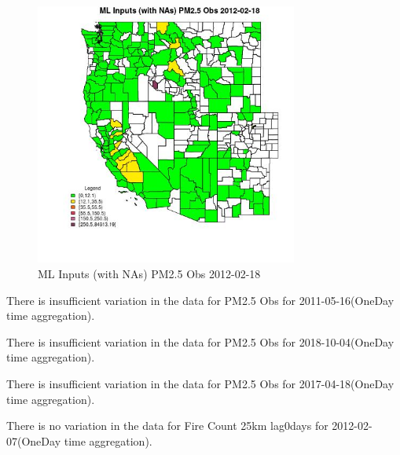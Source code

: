 \begin{figure} 
\centering  
\includegraphics[width=0.77\textwidth]{Code_Outputs/Report_ML_input_PM25_Step4_part_f_de_duplicated_aveswNAs_CountyPM25_ObsMean2012-02-18.jpg} 
\caption{\label{fig:Report_ML_input_PM25_Step4_part_f_de_duplicated_aveswNAsCountyPM25_ObsMean2012-02-18}ML Inputs (with NAs) PM2.5 Obs 2012-02-18} 
\end{figure} 
 

There is insufficient variation in the data for PM2.5 Obs for 2011-05-16(OneDay time aggregation). 
 

There is insufficient variation in the data for PM2.5 Obs for 2018-10-04(OneDay time aggregation). 
 

There is insufficient variation in the data for PM2.5 Obs for 2017-04-18(OneDay time aggregation). 
 

There is no variation in the data for Fire Count 25km lag0days for 2012-02-07(OneDay time aggregation). 
 

